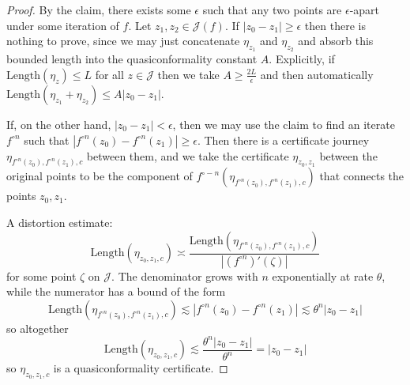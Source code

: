 \begin{proof}
By the claim, there exists some $\epsilon$ such that any two points
are $\epsilon$-apart under some iteration of $f$. Let $z_{1},z_{2}\in\mathcal{J}(f)$.
If $\left|z_{0}-z_{1}\right|\geq\epsilon$ then there is nothing to
prove, since we may just concatenate $\eta_{z_{1}}$ and $\eta_{z_{2}}$
and absorb this bounded length into the quasiconformality constant
$A$. Explicitly, if $\mathrm{Length}\left(\eta_{z}\right)\leq L$
for all $z\in\mathcal{J}$ then we take $A\geq\frac{2L}{\epsilon}$
and then automatically $\mathrm{Length}\left(\eta_{z_{1}}+\eta_{z_{2}}\right)\leq A\left|z_{0}-z_{1}\right|$.

If, on the other hand, $\left|z_{0}-z_{1}\right|<\epsilon$, then
we may use the claim to find an iterate $f^{\circ n}$ such that $\left|f^{\circ n}(z_{0})-f^{\circ n}(z_{1})\right|\geq\epsilon$.
Then there is a certificate journey $\eta_{f^{\circ n}(z_{0}),f^{\circ n}(z_{1}),c}$
between them, and we take the certificate $\eta_{z_{0},z_{1}}$ between
the original points to be the component of $f^{\circ-n}\left(\eta_{f^{\circ n}(z_{0}),f^{\circ n}(z_{1}),c}\right)$
that connects the points $z_{0},z_{1}$.

A distortion estimate: 
\[
\mathrm{Length}\left(\eta_{z_{0},z_{1},c}\right)\asymp\frac{\mathrm{Length}\left(\eta_{f^{\circ n}(z_{0}),f^{\circ n}(z_{1}),c}\right)}{\left|\left(f^{\circ n}\right)'\left(\zeta\right)\right|}
\]
 for some point $\zeta$ on $\mathcal{J}$. The denominator grows
with $n$ exponentially at rate $\theta$, while the numerator has
a bound of the form 
\[
\mathrm{Length}\left(\eta_{f^{\circ n}(z_{0}),f^{\circ n}(z_{1}),c}\right)\lesssim\left|f^{\circ n}(z_{0})-f^{\circ n}(z_{1})\right|\lesssim\theta^{n}\left|z_{0}-z_{1}\right|
\]
 so altogether 
\[
\mathrm{Length}\left(\eta_{z_{0},z_{1},c}\right)\lesssim\frac{\theta^{n}\left|z_{0}-z_{1}\right|}{\theta^{n}}=\left|z_{0}-z_{1}\right|
\]
 so $\eta_{z_{0},z_{1},c}$ is a quasiconformality certificate.


\end{proof}
